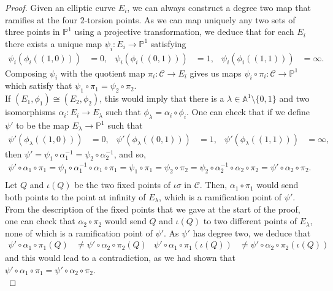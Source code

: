 \documentclass[10pt,a4paper]{amsart}
\newcommand{\calC}{\mathcal{C}}
\begin{document}
\begin{proof}
Given an elliptic curve $E_i$, we can always construct a degree two map that ramifies at the four $2$-torsion points. As we can map uniquely any two sets of three points in $\mathbb{P}^1$ using a projective transformation, we deduce that for each $E_i$ there exists a unique map $\psi_i: E_i\rightarrow\mathbb{P}^1$ satisfying
\begin{align*}
\psi_i(\phi_i((1,0)))&=0, & \psi_i(\phi_i((0,1)))&=1, &  \psi_i(\phi_i((1,1)))&=\infty.
\end{align*}
Composing $\psi_i$ with the quotient map $\pi_i:\calC\rightarrow E_i$ gives us maps $\psi_i\circ\pi_i:\calC\rightarrow\mathbb{P}^1$ which satisfy that $\psi_1\circ\pi_1=\psi_2\circ\pi_2$.\\

If $(E_1,\phi_1)\cong(E_2,\phi_2)$, this would imply that there is a $\lambda\in\mathbb{A}^1\setminus\{0,1\}$ and two isomorphisms $\alpha_i:E_i\rightarrow E_\lambda$ such that $\phi_\lambda=\alpha_i\circ\phi_i$. 
One can check that if we define $\psi'$ to be the map $E_\lambda\rightarrow\mathbb{P}^1$ such that
\begin{align*}
\psi'(\phi_\lambda((1,0)))&=0, & \psi'(\phi_\lambda((0,1)))&=1, &  \psi'(\phi_\lambda((1,1)))&=\infty,
\end{align*}
then $\psi'=\psi_1\circ\alpha_1^{-1}=\psi_2\circ\alpha_2^{-1}$, and so,
\begin{align*}
\psi'\circ\alpha_1\circ\pi_1=\psi_1\circ\alpha_1^{-1}\circ\alpha_1\circ\pi_1=\psi_1\circ\pi_1=\psi_2\circ\pi_2=\psi_2\circ\alpha_2^{-1}\circ\alpha_2\circ\pi_2=\psi'\circ\alpha_2\circ\pi_2.\\
\end{align*}
Let $Q$ and $\iota(Q)$ be the two fixed points of $\iota\sigma$ in $\calC$. Then, $\alpha_1\circ\pi_1$ would send both points to the point at infinity of $E_\lambda$, which is a ramification point of $\psi'$. From the description of the fixed points that we gave at the start of the proof, one can check that $\alpha_2\circ\pi_2$ would send $Q$ and $\iota(Q)$ to two different points of $E_\lambda$, none of which is a ramification point of $\psi'$. As $\psi'$ has degree two, we deduce that 
\begin{align*}
\psi'\circ\alpha_1\circ\pi_1(Q)&\neq\psi'\circ\alpha_2\circ\pi_2(Q) & \psi'\circ\alpha_1\circ\pi_1(\iota(Q))&\neq\psi'\circ\alpha_2\circ\pi_2(\iota(Q)) 
\end{align*}
and this would lead to a contradiction, as we had shown that $\psi'\circ\alpha_1\circ\pi_1=\psi'\circ\alpha_2\circ\pi_2$.\\[10pt]


\end{proof}
\end{document}
